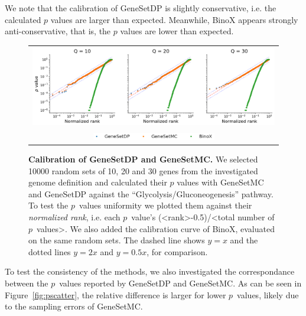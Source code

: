 \documentclass[a4paper,american]{lipics-v2016}
\begin{document}
We note that the calibration of GeneSetDP is slightly conservative, i.e. the calculated $p$ values are larger than expected. Meanwhile, BinoX appears strongly anti-conservative, that is, the $p$ values are lower than expected.

\begin{figure}[htb]
  \begin{center}
		  \begin{tabular}[t]{c}
				\includegraphics[width=1.0\textwidth]{figures/calibration_multiple.png} \\
				\includegraphics[width=0.5\textwidth]{figures/calibration_legend.png}
		\end{tabular}
  \end{center}
  \caption{{\bf Calibration of GeneSetDP and GeneSetMC.} We selected 10000 random sets of 10, 20 and 30 genes from the investigated genome definition and calculated their $p$ values with GeneSetMC and GeneSetDP against the ``Glycolysis/Gluconeogenesis'' pathway. To test the $p$~values uniformity we plotted them against their {\em normalized rank}, i.e. each $p$~value's (<rank>-0.5)/<total number of $p$~values>. We also added the calibration curve of BinoX, evaluated on the same random sets. The dashed line shows $y = x$ and the dotted lines $y = 2x$ and $y = 0.5x$, for comparison.}
  \label{fig:calibration}
\end{figure}

To test the consistency of the methods, we also investigated the correspondance between the $p$~values reported by GeneSetDP and GeneSetMC. As can be seen in Figure~\ref{fig:pscatter}, the relative difference is larger for lower $p$~values, likely due to the sampling errors of GeneSetMC.
\end{document}
